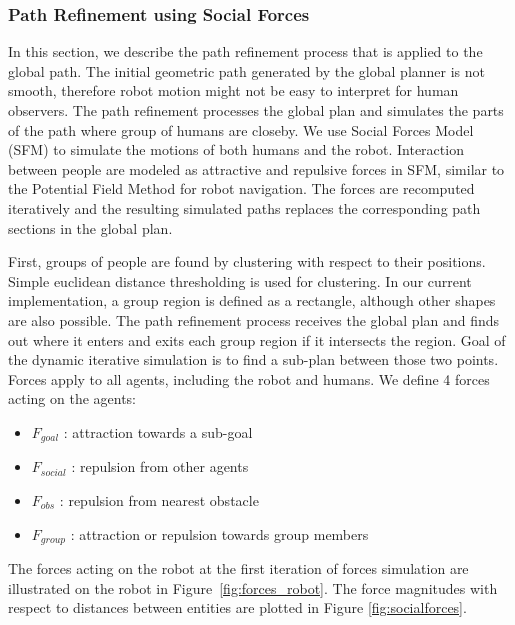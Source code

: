 \subsubsection{Path Refinement using Social Forces}
\label{sec:navigation_path_refinement}

In this section, we describe the path refinement process that is applied to the global path. The initial geometric path generated by the global planner is not smooth, therefore robot motion might not be easy to interpret for human observers. The path refinement processes the global plan and simulates the parts of the path where group of humans are closeby. We use Social Forces Model (SFM) \cite{helbing1995social} to simulate the motions of both humans and the robot. Interaction between people are modeled as attractive and repulsive forces in SFM, similar to the Potential Field Method \cite{khatib1986real} for robot navigation. The forces are recomputed iteratively and the resulting simulated paths replaces the corresponding path sections in the global plan.

First, groups of people are found by clustering with respect to their positions. Simple euclidean distance thresholding is used for clustering. In our current implementation, a group region is defined as a rectangle, although other shapes are also possible. The path refinement process receives the global plan and finds out where it enters and exits each group region if it intersects the region. Goal of the dynamic iterative simulation is to find a sub-plan between those two points. Forces apply to all agents, including the robot and humans. We define 4 forces acting on the agents:
\begin{itemize}
  \item $F_{goal}$ : attraction towards a sub-goal
  \item $F_{social}$ : repulsion from other agents
  \item $F_{obs}$ : repulsion from nearest obstacle
  \item $F_{group}$ : attraction or repulsion towards group members
\end{itemize}
The forces acting on the robot at the first iteration of forces simulation are illustrated on the robot in Figure~\ref{fig:forces_robot}. The force magnitudes with respect to distances between entities are plotted in Figure \ref{fig:socialforces}. 

